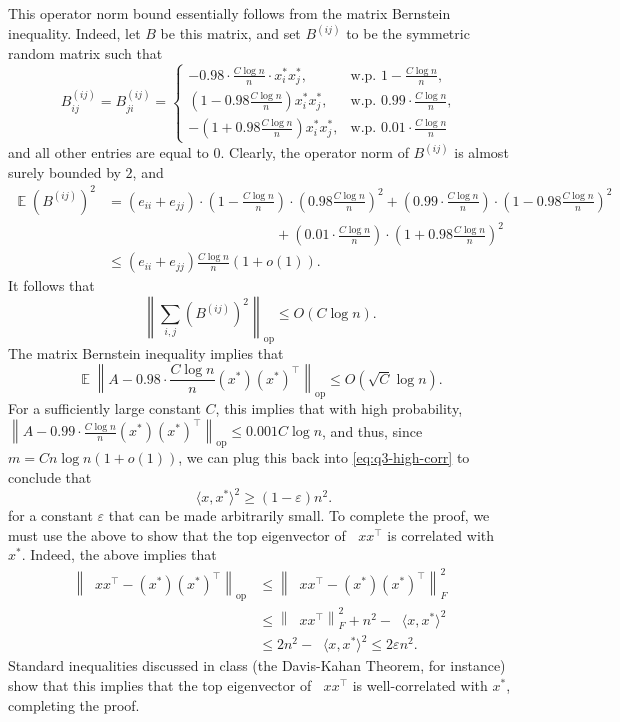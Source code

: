 \documentclass[11pt]{article}
\theoremstyle{definition}
\newcommand{\norm}[1]{\left\| #1 \right\|}
\renewcommand{\epsilon}{\varepsilon}
\newcommand{\eps}{\epsilon}
\DeclareMathOperator{\E}{\mathbb{E}} %
\DeclareMathOperator{\pE}{\widetilde{\mathbb{E}}} %
\newcommand{\opnorm}[1]{\left\|#1\right\|_{\mathrm{op}}}
\begin{document}
\begin{enumerate}[label=(\alph*)]
    This operator norm bound essentially follows from the matrix Bernstein inequality. Indeed, let $B$ be this matrix, and set $B^{(ij)}$ to be the symmetric random matrix such that
    \[ B^{(ij)}_{ij} = B^{(ij)}_{ji} = \begin{cases} - 0.98 \cdot \frac{C \log n}{n} \cdot x_i^* x_j^*, & \text{w.p. } 1 - \frac{C \log n}{n}, \\ \left( 1 - 0.98 \frac{C \log n}{n} \right) x_i^* x_j^*, & \text{w.p. } 0.99 \cdot \frac{C \log n}{n}, \\ - \left( 1 + 0.98 \frac{C \log n}{n} \right) x_i^* x_j^*, & \text{w.p. } 0.01 \cdot \frac{C \log n}{n} \end{cases} \]
    and all other entries are equal to $0$. Clearly, the operator norm of $B^{(ij)}$ is almost surely bounded by $2$, and
    \begin{align*}
      \E (B^{(ij)})^2 &= (e_{ii} + e_{jj}) \cdot \left( 1 - \frac{C \log n}{n} \right) \cdot \left( 0.98 \frac{C \log n}{n} \right)^2 + \left( 0.99 \cdot \frac{C \log n}{n} \right) \cdot \left( 1 - 0.98 \frac{C \log n}{n} \right)^2 \\
      &\qquad\qquad\qquad\qquad\qquad\qquad+ \left( 0.01 \cdot \frac{C \log n}{n} \right) \cdot \left( 1 + 0.98 \frac{C \log n}{n} \right)^2 \\
        &\le (e_{ii} + e_{jj}) \frac{C \log n}{n} \left( 1 + o(1) \right).
    \end{align*}
    It follows that
    \[ \opnorm{ \sum_{i,j} (B^{(ij)})^2 } \le O(C \log n). \]
    The matrix Bernstein inequality implies that
    \[ \E \opnorm{ A - 0.98 \cdot \frac{C \log n}{n} (x^*)(x^*)^\top } \le O\left( \sqrt{C} \log n \right). \]
    For a sufficiently large constant $C$, this implies that with high probability, $\opnorm{ A - 0.99 \cdot \frac{C \log n}{n} (x^*)(x^*)^\top } \le 0.001 C \log n$, and thus, since $m = C n \log n (1+o(1))$, we can plug this back into \eqref{eq:q3-high-corr} to conclude that
    \[ \pE \langle x,x^*\rangle^2 \ge (1-\eps) n^2. \]
    for a constant $\eps$ that can be made arbitrarily small.
    To complete the proof, we must use the above to show that the top eigenvector of $\pE xx^\top$ is correlated with $x^*$. Indeed, the above implies that
    \begin{align*}
      \opnorm{\pE xx^\top - (x^*)(x^*)^\top} &\le \norm{ \pE xx^\top - (x^*)(x^*)^\top }_F^2 \\
        &\le \norm{\pE xx^\top}_F^2 + n^2 - \pE \langle x,x^*\rangle^2 \\
        &\le 2n^2 - \pE \langle x,x^*\rangle^2 \le 2\eps n^2.
    \end{align*}
    Standard inequalities discussed in class (the Davis-Kahan Theorem, for instance) show that this implies that the top eigenvector of $\pE xx^\top$ is well-correlated with $x^*$, completing the proof.

  \end{enumerate}
\end{document}
